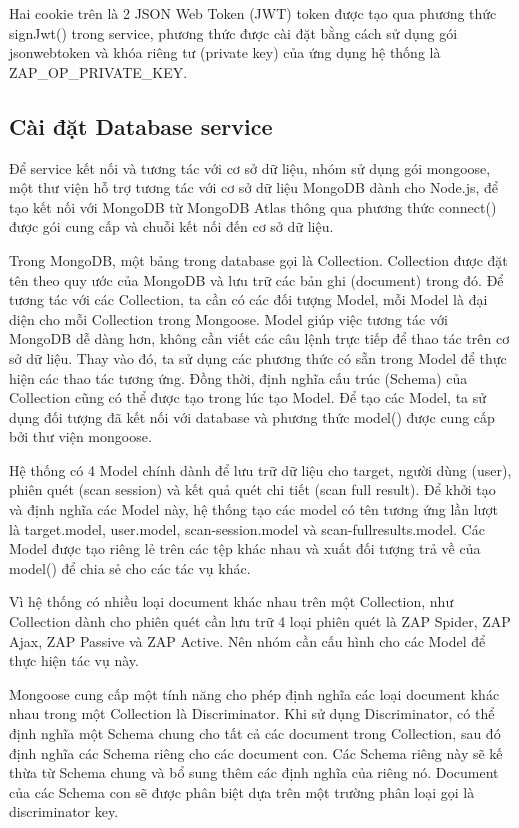 Hai cookie trên là 2 JSON Web Token (JWT) token được tạo qua phương thức signJwt() trong service, phương thức được cài đặt bằng cách sử dụng gói jsonwebtoken và khóa riêng tư (private key) của ứng dụng hệ thống là ZAP\_OP\_PRIVATE\_KEY.

\subsection{Cài đặt Database service}

\tab Để service kết nối và tương tác với cơ sở dữ liệu, nhóm sử dụng gói mongoose, một thư viện hỗ trợ tương tác với cơ sở dữ liệu MongoDB dành cho Node.js, để tạo kết nối với MongoDB từ MongoDB Atlas thông qua phương thức connect() được gói cung cấp và chuỗi kết nối đến cơ sở dữ liệu.
\par

Trong MongoDB, một bảng trong database gọi là Collection. Collection được đặt tên theo quy ước của MongoDB và lưu trữ các bản ghi (document) trong đó. Để tương tác với các Collection, ta cần có các đối tượng Model, mỗi Model là đại diện cho mỗi Collection trong Mongoose. Model giúp việc tương tác với MongoDB dễ dàng hơn, không cần viết các câu lệnh trực tiếp để thao tác trên cơ sở dữ liệu. Thay vào đó, ta sử dụng các phương thức có sẵn trong Model để thực hiện các thao tác tương ứng. Đồng thời, định nghĩa cấu trúc (Schema) của Collection cũng có thể được tạo trong lúc tạo Model. Để tạo các Model, ta sử dụng đối tượng đã kết nối với database và phương thức model() được cung cấp bởi thư viện mongoose.
\par

Hệ thống có 4 Model chính dành để lưu trữ dữ liệu cho target, người dùng (user), phiên quét (scan session) và kết quả quét chi tiết (scan full result). Để khởi tạo và định nghĩa các Model này, hệ thống tạo các model có tên tương ứng lần lượt là target.model, user.model, scan-session.model và scan-fullresults.model. Các Model được tạo riêng lẻ trên các tệp khác nhau và xuất đối tượng trả về của model() để chia sẻ cho các tác vụ khác.

Vì hệ thống có nhiều loại document khác nhau trên một Collection, như Collection dành cho phiên quét cần lưu trữ 4 loại phiên quét là ZAP Spider, ZAP Ajax, ZAP Passive và ZAP Active. Nên nhóm cần cấu hình cho các Model để thực hiện tác vụ này.
\par

Mongoose cung cấp một tính năng cho phép định nghĩa các loại document khác nhau trong một Collection là Discriminator. Khi sử dụng Discriminator, có thể định nghĩa một Schema chung cho tất cả các document trong Collection, sau đó định nghĩa các Schema riêng cho các document con. Các Schema riêng này sẽ kế thừa từ Schema chung và bổ sung thêm các định nghĩa của riêng nó. Document của các Schema con sẽ được phân biệt dựa trên một trường phân loại gọi là discriminator key.
\par

